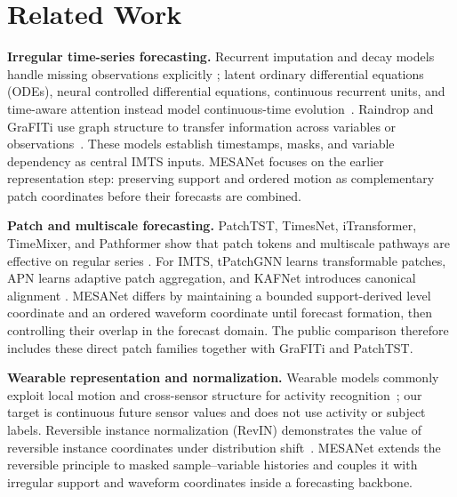 \section{Related Work}

\textbf{Irregular time-series forecasting.}
Recurrent imputation and decay models handle missing observations explicitly
\citep{che2018grud,cao2018brits}; latent ordinary differential equations
(ODEs), neural controlled differential equations, continuous recurrent units,
and time-aware attention instead model
continuous-time evolution~\citep{rubanova2019latent,kidger2020neuralcde,
shukla2021mtan,cru2022}. Raindrop and GraFITi use graph structure to transfer
information across variables or observations~\citep{raindrop2022,grafiti2024}.
These models establish timestamps, masks, and variable dependency as central
IMTS inputs. MESANet focuses on the earlier representation step: preserving
support and ordered motion as complementary patch coordinates before their
forecasts are combined.

\textbf{Patch and multiscale forecasting.}
PatchTST, TimesNet, iTransformer, TimeMixer, and Pathformer show that patch
tokens and multiscale pathways are effective on regular series
\citep{nie2023patchtst,timesnet2023,liu2024itransformer,timemixer2024,
pathformer2024}. For IMTS, tPatchGNN learns transformable patches, APN learns
adaptive patch aggregation, and KAFNet introduces canonical alignment
\citep{tpatchgnn2024,apn2026,kafnet2026}. MESANet differs by maintaining a
bounded support-derived level coordinate and an ordered waveform coordinate
until forecast formation, then controlling their overlap in the forecast
domain. The public comparison therefore includes these direct patch
families together with GraFITi and PatchTST.

\textbf{Wearable representation and normalization.}
Wearable models commonly exploit local motion and cross-sensor structure for
activity recognition~\citep{ordonez2016deepconv,abedin2021attend,
zhou2022tinyhar}; our target is continuous future sensor values and does not
use activity or subject labels. Reversible instance normalization (RevIN)
demonstrates the value of reversible instance coordinates under distribution
shift~\citep{kim2022revin}. MESANet
extends the reversible principle to masked sample--variable histories and
couples it with irregular support and waveform coordinates inside a forecasting
backbone.
